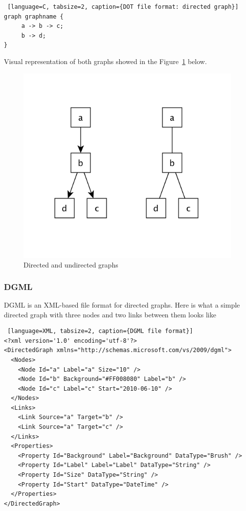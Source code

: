 \documentclass[a4paper,oneside]{article}
\begin{document}
\begin{center}
\begin{lstlisting} [language=C, tabsize=2, caption={DOT file format: directed graph}]
graph graphname {
     a -> b -> c;
     b -> d;
}
\end{lstlisting}
\end{center}

Visual representation of both graphs showed in the Figure~\ref{dot_graphs} below.

\begin{figure}
\begin{center}
    \includegraphics[scale=0.3]{dot_graph.png}
	\caption{Directed and undirected graphs}
	\label{dot_graphs}
\end{center}
\end{figure}

\subsubsection{DGML}
DGML is an XML-based file format for directed graphs. Here is what a simple directed graph with three nodes and two links between them looks like

\begin{center}
\begin{lstlisting} [language=XML, tabsize=2, caption={DGML file format}]
<?xml version='1.0' encoding='utf-8'?>
<DirectedGraph xmlns="http://schemas.microsoft.com/vs/2009/dgml">
  <Nodes>
    <Node Id="a" Label="a" Size="10" />
    <Node Id="b" Background="#FF008080" Label="b" />
    <Node Id="c" Label="c" Start="2010-06-10" />
  </Nodes>
  <Links>
    <Link Source="a" Target="b" />
    <Link Source="a" Target="c" />
  </Links>
  <Properties>
    <Property Id="Background" Label="Background" DataType="Brush" />
    <Property Id="Label" Label="Label" DataType="String" />
    <Property Id="Size" DataType="String" />
    <Property Id="Start" DataType="DateTime" />
  </Properties>
</DirectedGraph>
\end{lstlisting}
\end{center}
\end{document}
